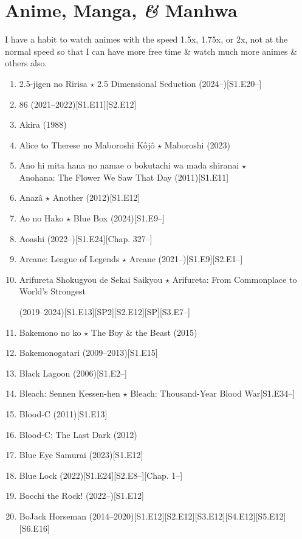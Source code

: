 \documentclass{article}
\begin{document}
\section{Anime, Manga, {\it\&} Manhwa}
I have a habit to watch animes with the speed 1.5x, 1.75x, or 2x, not at the normal speed so that I can have more free time \& watch much more animes \& others also.
\begin{enumerate}
	\item 2.5-jigen no Ririsa $\star$ 2.5 Dimensional Seduction (2024--)\hfill[S1.E20--]
	\item 86 (2021--2022)\hfill[S1.E11][S2.E12]
    \item {\sc Akira} (1988)
    \item {\sc Alice to Therese no Maboroshi Kôjô $\star$ Maboroshi} (2023)
    \item {\sc Ano hi mita hana no namae o bokutachi wa mada shiranai $\star$\\Anohana: The Flower We Saw That Day} (2011)\hfill[S1.E11]
    \item {\sc Anazâ $\star$ Another} (2012)\hfill[S1.E12]
    \item Ao no Hako $\star$ Blue Box (2024)\hfill[S1.E9--]
    \item Aoashi (2022--)\hfill[S1.E24][Chap. 327--]
    
    
    \item {\sc Arcane: League of Legends $\star$ Arcane} (2021--)\hfill[S1.E9][S2.E1--]
    \item  Arifureta Shokugyou de Sekai Saikyou $\star$ Arifureta: From Commonplace to World's Strongest
    
    (2019--2024)\hfill[S1.E13][SP2][S2.E12][SP][S3.E7--]
    \item {\sc Bakemono no ko $\star$ The Boy \& the Beast} (2015)
    \item {\sc Bakemonogatari} (2009--2013)\hfill[S1.E15]
    \item Black Lagoon (2006)\hfill[S1.E2--]
    \item Bleach: Sennen Kessen-hen $\star$ Bleach: Thousand-Year Blood War\hfill[S1.E34--]
    \item {\sc Blood-C} (2011)\hfill[S1.E13]
    \item Blood-C: The Last Dark (2012)
    \item {\sc Blue Eye Samurai} (2023)\hfill[S1.E12]
    \item Blue Lock (2022)\hfill[S1.E24][S2.E8--][Chap. 1--]
    \item Bocchi the Rock! (2022--)\hfill[S1.E12]
    \item {\sc BoJack Horseman} (2014--2020)\hfill[S1.E12][S2.E12][S3.E12][S4.E12][S5.E12][S6.E16]
    

\end{enumerate}
\end{document}
